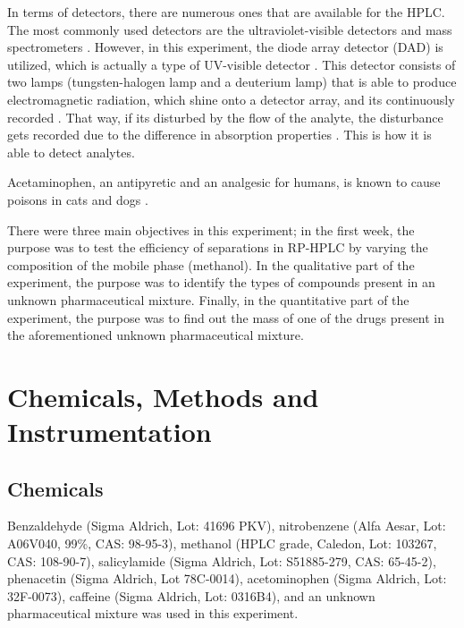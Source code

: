 \documentclass[a4paper, 12pt]{article}
\begin{document}
In terms of detectors, there are numerous ones that are available for the HPLC. The most commonly used detectors are the ultraviolet-visible detectors and mass spectrometers \cite{vitha_chromatography:_2017}. However, in this experiment, the diode array detector (DAD) is utilized, which is actually a type of UV-visible detector \cite{vitha_chromatography:_2017}. This detector consists of two lamps (tungsten-halogen lamp and a deuterium lamp) that is able to produce electromagnetic radiation, which shine onto a detector array, and its continuously recorded  \cite{vitha_chromatography:_2017}. That way, if its disturbed by the flow of the analyte, the disturbance gets recorded due to the difference in absorption properties \cite{vitha_chromatography:_2017}. This is how it is able to detect analytes.

Acetaminophen, an antipyretic and an analgesic for humans, is known to cause poisons in cats and dogs \cite{dogs-cats}.

There were three main objectives in this experiment; in the first week, the purpose was to test the efficiency of separations in RP-HPLC by varying the composition of the mobile phase (methanol). In the qualitative part of the experiment, the purpose was to identify the types of compounds present in an unknown pharmaceutical mixture. Finally, in the quantitative part of the experiment, the purpose was to find out the mass of one of the drugs present in the aforementioned unknown pharmaceutical mixture.


\section{Chemicals, Methods and Instrumentation}

\subsection{Chemicals}
Benzaldehyde (Sigma Aldrich, Lot: 41696 PKV), nitrobenzene (Alfa Aesar, Lot: A06V040, 99\%, CAS: 98-95-3), methanol (HPLC grade, Caledon, Lot: 103267, CAS: 108-90-7), salicylamide (Sigma Aldrich, Lot: S51885-279, CAS: 65-45-2), phenacetin (Sigma Aldrich, Lot 78C-0014), acetominophen (Sigma Aldrich, Lot: 32F-0073), caffeine (Sigma Aldrich, Lot: 0316B4), and an unknown pharmaceutical mixture was used in this experiment.
\end{document}

